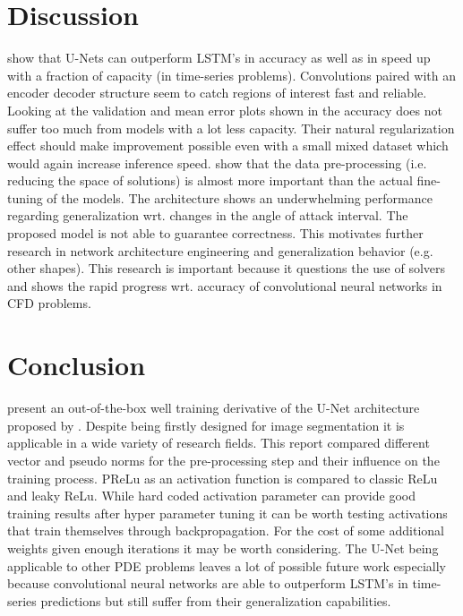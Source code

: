\documentclass[acmtog]{techreportacmart}
\begin{document}
\section{Discussion}
\cite{Fotiadis2020} show that U-Nets can outperform LSTM's in accuracy as well as in speed 
up with a fraction of capacity (in time-series problems). Convolutions paired with an encoder 
decoder structure seem to catch regions of interest fast and reliable. Looking at the validation 
and mean error plots shown in \cite{Thuerey20} the accuracy does not suffer too much from models 
with a lot less capacity. Their natural regularization effect should make improvement possible 
even with a small mixed dataset which would again increase inference speed. 
\cite{Thuerey20} show that the data pre-processing (i.e. reducing 
the space of solutions) is almost more important than the actual fine-tuning of the models. 
The architecture shows an underwhelming performance regarding generalization wrt. changes in the
angle of attack interval. The proposed model is not able to guarantee correctness. This motivates
further research in network architecture engineering and generalization behavior (e.g. other shapes).
This research is important because it questions the use of solvers and shows the rapid progress 
wrt. accuracy of convolutional neural networks in CFD problems.

\section{Conclusion} 
\cite{Thuerey20} present an out-of-the-box well training derivative of the U-Net architecture 
proposed by \cite{ronneberger2015}. Despite being firstly designed for image segmentation it is 
applicable in a wide variety of research fields. This report compared different vector and pseudo 
norms for the pre-processing step and their influence on the training process. PReLu as an activation 
function is compared to classic ReLu and leaky ReLu. While hard coded activation parameter can provide 
good training results after hyper parameter tuning it can be worth testing activations that train 
themselves through backpropagation. For the cost of some additional weights given enough iterations 
it may be worth considering. The U-Net being applicable to other PDE problems leaves a lot of possible 
future work especially because convolutional neural networks are able to outperform LSTM's in time-series predictions
but still suffer from their generalization capabilities. 

\newpage


\end{document}

